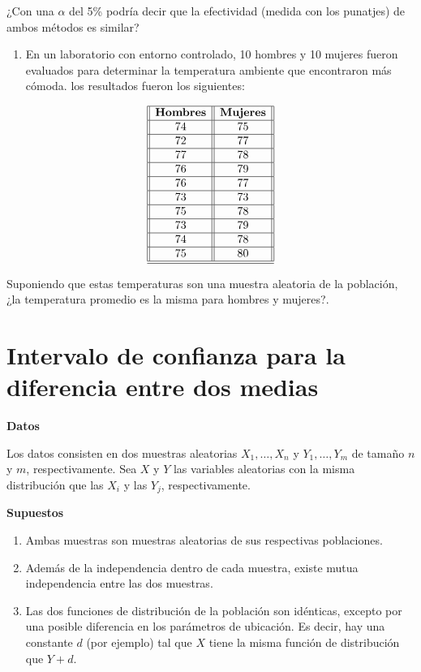 \documentclass[
  a4paper,
  oneside,
  openany]{book}
\providecommand{\tightlist}{%
  \setlength{\itemsep}{0pt}\setlength{\parskip}{0pt}}
\begin{document}
¿Con una \(\alpha\) del 5\% podría decir que la efectividad (medida con los punatjes) de ambos métodos es similar?

\begin{enumerate}
\def\labelenumi{\arabic{enumi}.}
\setcounter{enumi}{1}
\tightlist
\item
  En un laboratorio con entorno controlado, 10 hombres y 10 mujeres fueron evaluados para determinar la temperatura ambiente que encontraron más cómoda. los resultados fueron los siguientes:
\end{enumerate}

\[
\begin{array}{||c| |c||} 
\hline 
\textbf{Hombres} & \textbf{Mujeres} \\  
 \hline
74&75\\
 \hline
72&77\\
 \hline
77&78\\
 \hline
76&79\\
 \hline
76&77\\
 \hline
73&73\\
 \hline
75&78\\
 \hline
73&79\\
 \hline
74&78\\
 \hline
75&80\\
  \hline
\hline
\end{array}
\]

Suponiendo que estas temperaturas son una muestra aleatoria de la población, ¿la temperatura promedio es la misma para hombres y mujeres?.

\hypertarget{intervalo-de-confianza-para-la-diferencia-entre-dos-medias}{%
\chapter{Intervalo de confianza para la diferencia entre dos medias}\label{intervalo-de-confianza-para-la-diferencia-entre-dos-medias}}

\textbf{Datos}

Los datos consisten en dos muestras aleatorias \(X_{1}, \ldots, X_{n}\) y \(Y_{1}, \ldots, Y_{m}\) de tamaño \(n\) y \(m\), respectivamente. Sea \(X\) y \(Y\) las variables aleatorias con la misma distribución que las \(X_{i}\) y las \(Y_{j}\), respectivamente.

\textbf{Supuestos}

\begin{enumerate}
\def\labelenumi{\arabic{enumi})}
\item
  Ambas muestras son muestras aleatorias de sus respectivas poblaciones.
\item
  Además de la independencia dentro de cada muestra, existe mutua independencia entre las dos muestras.
\item
  Las dos funciones de distribución de la población son idénticas, excepto por una posible diferencia en los parámetros de ubicación. Es decir, hay una constante \(d\) (por ejemplo) tal que \(X\) tiene la misma función de distribución que \(Y + d\).
\end{enumerate}
\end{document}
